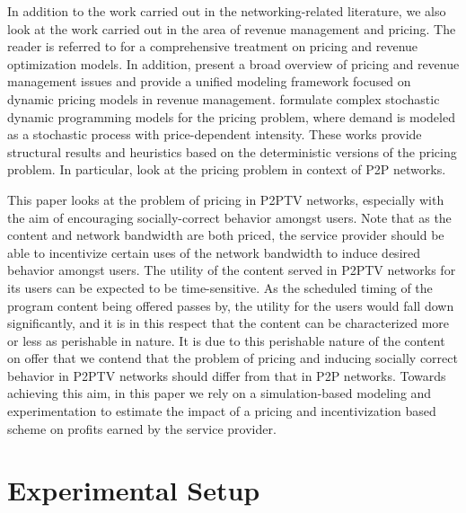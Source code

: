 \documentclass[conference,a4paper]{IEEEtran}
\begin{document}
In addition to the work carried out in the networking-related literature, we also look at the work carried out in the area of revenue management and pricing. The reader is referred to \cite{Phillips2005,Talluri2004} for a comprehensive treatment on pricing and revenue optimization models. In addition, \cite{Bitran2003,Elmaghraby2003} present a broad overview of pricing and revenue management issues and provide a unified modeling framework focused on dynamic pricing models in revenue management. \cite{Gallego1997,Kleywegt2001,Maglaras2004} formulate complex stochastic dynamic programming models for the pricing problem, where demand is modeled as a stochastic process with price-dependent intensity. These works provide structural results and heuristics based on the deterministic versions of the pricing problem. In particular, \cite{Paschalidis2000,Yeung2006,Zghaibeh2006} look at the pricing problem in context of P2P networks.

This paper looks at the problem of pricing in P2PTV networks, especially with the aim of encouraging socially-correct behavior amongst users. Note that as the content and network bandwidth are both priced, the service provider should be able to incentivize certain uses of the network bandwidth to induce desired behavior amongst users. The utility of the content served in P2PTV networks for its users can be expected to be time-sensitive. As the scheduled timing of the program content being offered passes by, the utility for the users would fall down significantly, and it is in this respect that the content can be characterized more or less as perishable in nature. It is due to this perishable nature of the content on offer that we contend that the problem of pricing and inducing socially correct behavior in P2PTV networks should differ from that in P2P networks. Towards achieving this aim, in this paper we rely on a simulation-based modeling and experimentation to estimate the impact of a pricing and incentivization based scheme on profits earned by the service provider. 

\section{Experimental Setup}
\label{sec:experimental-setup}
\end{document}

